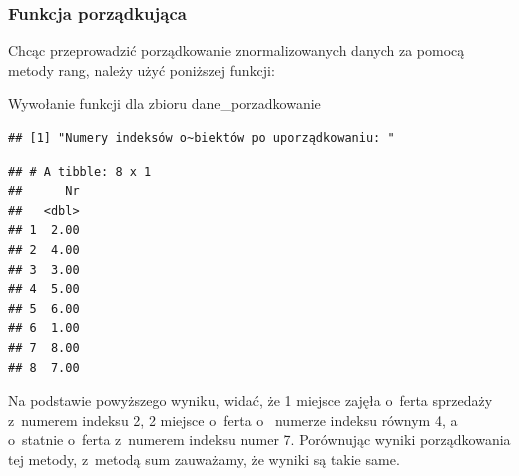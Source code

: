 \documentclass[12pt,a4paper]{report}
\begin{document}
{\subsubsection{Funkcja porządkująca}\label{funkcja-porzadkujaca-metoda-rang}
Chcąc przeprowadzić porządkowanie znormalizowanych danych za pomocą metody rang, należy użyć poniższej funkcji:
\begin{Shaded}
\begin{Highlighting}[]
  \NormalTok{\{}
  \NormalTok{:}
  \NormalTok{\{}
    \NormalTok{x[}\NormalTok{]=}
  \NormalTok{\}}
  \NormalTok{x[,}\NormalTok{] <-} 
  \NormalTok{:}
  \NormalTok{\{}
    \NormalTok{):(}\NormalTok{))}
    \NormalTok{\{}
      \NormalTok{x[i,}\NormalTok{(x)]=x[i,}\NormalTok{(x)]+x[i,j]}
    \NormalTok{\}}
    \NormalTok{x[i,}\NormalTok{(x)]=x[i,}\NormalTok{(x)]/(}\NormalTok{)}
  \NormalTok{\}}
  \NormalTok{x<-x[}\NormalTok{(x$zmienna_syntetyczna),]}
  \NormalTok{(}\NormalTok{)}
  \NormalTok{(x[}\NormalTok{])}
\NormalTok{\}}
\end{Highlighting}
\end{Shaded}
Wywołanie funkcji dla zbioru dane\_porzadkowanie 
\begin{Shaded}
\begin{Highlighting}[]
\end{Highlighting}
\end{Shaded}
\begin{verbatim}
## [1] "Numery indeksów o~biektów po uporządkowaniu: "
\end{verbatim}
\begin{verbatim}
## # A tibble: 8 x 1
##      Nr
##   <dbl>
## 1  2.00
## 2  4.00
## 3  3.00
## 4  5.00
## 5  6.00
## 6  1.00
## 7  8.00
## 8  7.00
\end{verbatim}
Na podstawie powyższego wyniku, widać, że 1 miejsce zajęła o~ferta
sprzedaży z~numerem indeksu 2, 2 miejsce o~ferta o~ numerze indeksu równym 4, a o~statnie o~ferta z~numerem indeksu numer 7. Porównując wyniki porządkowania tej metody, z~metodą sum zauważamy, że wyniki są takie same. 
}
\end{document}

